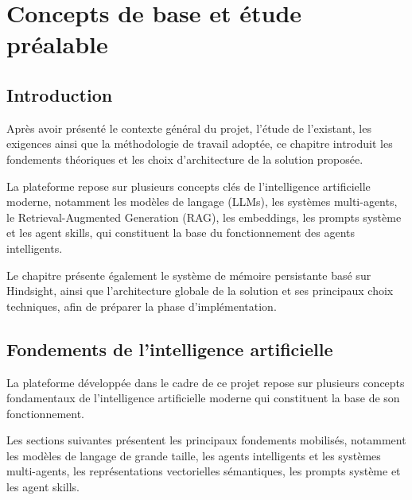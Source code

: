 ﻿%

\chapter{Concepts de base et étude préalable}

\minitoc

\newpage

\section{Introduction}

Après avoir présenté le contexte général du projet, l'étude de l'existant, les exigences ainsi que la méthodologie de travail adoptée, ce chapitre introduit les fondements théoriques et les choix d'architecture de la solution proposée.

La plateforme repose sur plusieurs concepts clés de l'intelligence artificielle moderne, notamment les modèles de langage (LLMs), les systèmes multi-agents, le Retrieval-Augmented Generation (RAG), les embeddings, les prompts système et les agent skills, qui constituent la base du fonctionnement des agents intelligents.

Le chapitre présente également le système de mémoire persistante basé sur Hindsight, ainsi que l'architecture globale de la solution et ses principaux choix techniques, afin de préparer la phase d'implémentation.

\section{Fondements de l'intelligence artificielle}

La plateforme développée dans le cadre de ce projet repose sur plusieurs concepts fondamentaux de l'intelligence artificielle moderne qui constituent la base de son fonctionnement.

Les sections suivantes présentent les principaux fondements mobilisés, notamment les modèles de langage de grande taille, les agents intelligents et les systèmes multi-agents, les représentations vectorielles sémantiques, les prompts système et les agent skills.

